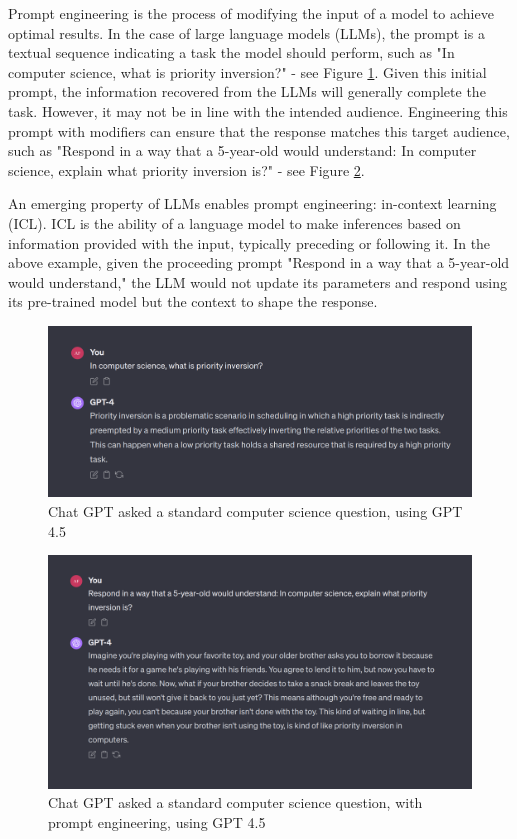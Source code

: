 Prompt engineering is the process of modifying the input of a model to achieve optimal results. In the case of large language models (LLMs), the prompt is a textual sequence indicating a task the model should perform, such as "In computer science, what is priority inversion?" - see Figure \ref{fig:priority-engineering}. Given this initial prompt, the information recovered from the LLMs will generally complete the task. However, it may not be in line with the intended audience. Engineering this prompt with modifiers can ensure that the response matches this target audience, such as "Respond in a way that a 5-year-old would understand: In computer science, explain what priority inversion is?" - see Figure \ref{fig:5-yo-prompt}.

An emerging property of LLMs enables prompt engineering: in-context learning (ICL). ICL is the ability of a language model to make inferences based on information provided with the input, typically preceding or following it. In the above example, given the proceeding prompt "Respond in a way that a 5-year-old would understand," the LLM would not update its parameters and respond using its pre-trained model but the context to shape the response.

\begin{figure}
    \centering
    \includegraphics[width=1\linewidth]{sections//images/what-is-priority-inversion.png}
    \caption{Chat GPT asked a standard computer science question, using GPT 4.5}
    \label{fig:priority-engineering}
\end{figure}

\begin{figure}
    \centering
    \includegraphics[width=1\linewidth]{sections//images/5-year-old-priority-inversion.png}
    \caption{Chat GPT asked a standard computer science question, with prompt engineering, using GPT 4.5}
    \label{fig:5-yo-prompt}
\end{figure}

